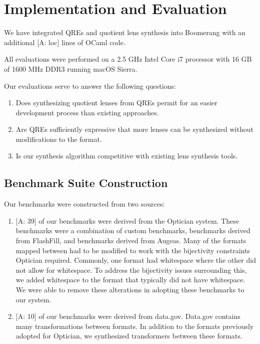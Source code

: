 \documentclass{svproc}
\newcommand{\FINISH}[3]{\ifdraft\textcolor{#1}{[#2: #3]}\fi}
\newcommand{\afm}[1]{\FINISH{dkgreen}{A}{#1}}
\begin{document}
\section{Implementation and Evaluation}
\label{impl}

We have integrated QREs and quotient lens synthesis into Boomerang with an
additional \afm{loc} lines of OCaml code. 

All evaluations were performed on a 2.5 GHz Intel Core i7 processor with 16 GB
of 1600 MHz DDR3 running macOS Sierra.

Our evaluations serve to answer the following questions:
\begin{enumerate}
\item Does synthesizing quotient lenses from QREs permit for an easier
  development process than existing approaches.

\item Are QREs sufficiently expressive that more lenses can be synthesized
  without modifications to the format. 

\item Is our synthesis algorithm competitive with existing lens synthesis
  tools.
\end{enumerate}

\subsection{Benchmark Suite Construction} 
Our benchmarks were constructed from two sources:
\begin{enumerate}
\item \afm{39} of our benchmarks were derived from the Optician system.  These
  benchmarks were a combination of custom benchmarks, benchmarks derived from
  FlashFill, and benchmarks derived from Augeas.  Many of the formats mapped
  between had to be modified to work with the bijectivity constraints
  Optician required.  Commonly, one format had whitespace where the other did
  not allow for whitespace.  To address the bijectivity issues surrounding this,
  we added whitespace to the format that typically did not have whitespace.  We
  were able to remove these alterations in adopting these benchmarks to our
  system.

\item \afm{10} of our benchmarks were derived from data.gov.  Data.gov contains
  many transformations between formats.  In addition to the formats previously
  adopted for Optician, we synthesized transformers between these formats.
\end{enumerate}
\end{document}
